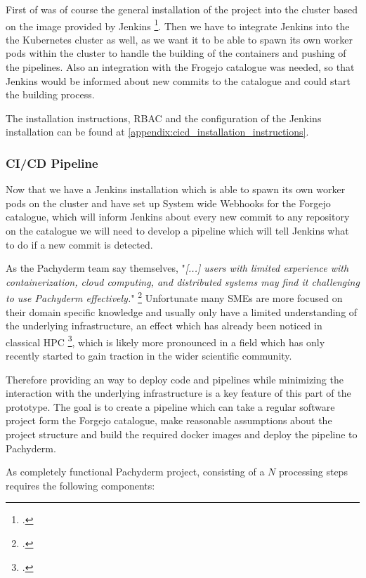 First of was of course the general installation of the project into the cluster based on the image provided by Jenkins \footcite{JenkinsJenkinsJenkinsci}.
Then we have to integrate Jenkins into the the Kubernetes cluster as well, as we want it to be able to spawn its own worker pods within the cluster to handle the building of the containers and pushing of the pipelines.
Also an integration with the Frogejo catalogue was needed, so that Jenkins would be informed about new commits to the catalogue and could start the building process.

The installation instructions, \ac{RBAC} and the configuration of the Jenkins installation can be found at \ref{appendix:cicd_installation_instructions}.

\subsubsection{CI/CD Pipeline}

Now that we have a Jenkins installation which is able to spawn its own worker pods on the cluster and have set up System wide Webhooks for the Forgejo catalogue,
which will inform Jenkins about every new commit to any repository on the catalogue we will need to develop a pipeline which will tell Jenkins what to do if a new commit is detected.

As the Pachyderm team say themselves, "\textit{[...] users with limited experience with containerization, cloud computing, and distributed systems may find it challenging to use Pachyderm effectively.}" \footcite{PachydermTargetAudience2023}
Unfortunate many \acp{SME} are more focused on their domain specific knowledge and usually only have a limited understanding of the underlying infrastructure, an effect which has already been noticed in classical \ac{HPC} \footcite{shenoiHPCEducationDomain2019}, 
which is likely more pronounced in a field which has only recently started to gain traction in the wider scientific community.

Therefore providing an way to deploy code and pipelines while minimizing the interaction with the underlying infrastructure is a key feature of this part of the prototype.
The goal is to create a pipeline which can take a regular software project form the Forgejo catalogue, make reasonable assumptions about the project structure and build the required docker images and deploy the pipeline to Pachyderm.

As completely functional Pachyderm project, consisting of a $N$ processing steps requires the following components:

